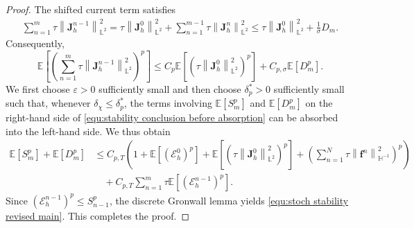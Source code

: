 \documentclass[10pt,a4paper]{amsart}
\newcommand{\bb}{\mathbb}
\newcommand{\bff}{\boldsymbol}
\newcommand{\norm}[2]{\left\|{#1}\right\|_{#2}}
\begin{document}
\begin{proof}
	The shifted current term satisfies
	\begin{align*}
		\sum_{n=1}^{m}
		\tau\norm{\bff J_h^{n-1}}{\bb L^2}^2
		=
		\tau\norm{\bff J_h^0}{\bb L^2}^2
		+
		\sum_{n=1}^{m-1}
		\tau\norm{\bff J_h^n}{\bb L^2}^2
		\le
		\tau\norm{\bff J_h^0}{\bb L^2}^2
		+
		\frac{1}{\sigma}D_m.
	\end{align*}
	Consequently,
	\[
	\bb E\left[
	\left(
	\sum_{n=1}^{m}
	\tau\norm{\bff J_h^{n-1}}{\bb L^2}^2
	\right)^p
	\right]
	\le
	C_p\bb E\left[
	\left(
	\tau\norm{\bff J_h^0}{\bb L^2}^2
	\right)^p
	\right]
	+
	C_{p,\sigma}\bb E[D_m^p].
	\]
	We first choose $\varepsilon>0$ sufficiently small and then choose
	$\delta_p^\ast>0$ sufficiently small such that, whenever
	$\delta_\chi\le\delta_p^\ast$, the terms involving
	$\bb E[S_m^p]$ and $\bb E[D_m^p]$ on the right-hand side of
	\eqref{equ:stability conclusion before absorption} can be absorbed into
	the left-hand side. We thus obtain
	\begin{align*}
		\bb E[S_m^p]
		+
		\bb E[D_m^p]
		&\le
		C_{p,T}
		\left(
		1
		+
		\bb E[(\mathcal E_h^0)^p]
		+
		\bb E\left[
		\left(
		\tau\norm{\bff J_h^0}{\bb L^2}^2
		\right)^p
		\right]
		+
		\left(
		\sum_{n=1}^{N}
		\tau\norm{\bff f^n}{\bb H^{-1}}^2
		\right)^p
		\right)
		\\
		&\quad
		+
		C_{p,T}
		\sum_{n=1}^{m}
		\tau\bb E[(\mathcal E_h^{n-1})^p].
	\end{align*}
	Since $(\mathcal E_h^{n-1})^p\le S_{n-1}^p$, the discrete Gronwall
	lemma yields \eqref{equ:stoch stability revised main}. This completes the
	proof.
\end{proof}
\end{document}
